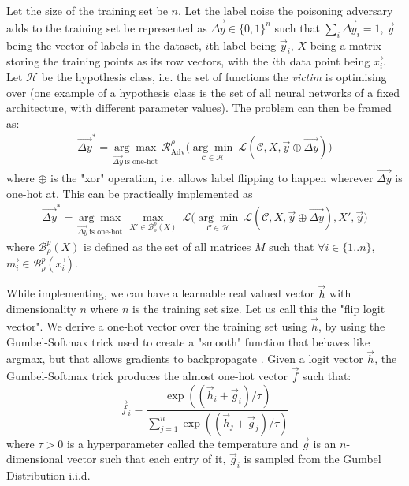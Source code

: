 \documentclass[12pt, oneside]{book}
\begin{document}
Let the size of the training set be $n$. Let the label noise the poisoning
adversary adds to the training set be represented as $\vec{\Delta y} \in \{0,
1\}^{n}$ such that $\sum_i \vec{\Delta y}_i = 1$, $\vec{y}$ being the vector of
labels in the dataset, $i$th label being $\vec{y}_i$, $X$ being a matrix storing
the training points as its row vectors, with the $i$th data point being
$\vec{x_i}$. Let $\mathcal{H}$ be the hypothesis class, i.e. the set of
functions the \emph{victim} is optimising over (one example of a hypothesis
class is the set of all neural networks of a fixed architecture, with different
parameter values). The problem can then be framed as:
\begin{equation}
    \label{eq:optimization}
    \begin{split}
    \vec{\Delta y}^*
    =
    {\underset{\vec{\Delta y}~\text{is one-hot}}
    {\arg\max}}~
    \mathcal{R}_{\text{Adv}}^{\rho}
    \biggl (
        \underset{\mathcal{C} \in \mathcal{H}}{\arg\min}~
        \mathcal{L}(\mathcal{C}, X, \vec{y} \oplus \vec{\Delta y})
    \biggr )
    \end{split}
\end{equation}
where $\oplus$ is the "xor" operation, i.e. allows label flipping to happen
wherever $\vec{\Delta y}$ is one-hot at. This can be practically implemented as
\begin{equation}
    \label{eq:optimization-prac}
    \begin{split}
    \vec{\Delta y}^*
    =
    {\underset{\vec{\Delta y}~\text{is one-hot}}
    {\arg\max}}~
    \underset{X' \in \mathcal{B}_\rho^{p}(X)}{\max}~\mathcal{L} \biggl(
    \underset{\mathcal{C} \in \mathcal{H}}{\arg\min}~
    \mathcal{L}(\mathcal{C}, X, \vec{y} \oplus \vec{\Delta y}),
    X', \vec{y}
    \biggr)
    \end{split}
\end{equation}
where $\mathcal{B}_\rho^{p}(X)$ is defined as the set of all matrices $M$ such
that $\forall i \in \{1..n\}$, $\vec{m_i} \in \mathcal{B}_\rho^{p}(\vec{x_i})$.


While implementing, we can have a learnable real valued vector $\vec{h}$ with
dimensionality $n$ where $n$ is the training set size. Let us call this the
"flip logit vector". We derive a one-hot vector over the training set using
$\vec{h}$, by using the Gumbel-Softmax trick used to create a "smooth" function
that behaves like argmax, but that allows gradients to backpropagate
\citep{DBLP:conf/iclr/MaddisonMT17}. Given a logit vector $\vec{h}$, the
Gumbel-Softmax trick produces the almost one-hot vector $\vec{f}$ such that:
\begin{equation*}
    \vec{f}_i = \frac{\exp((\vec{h}_i + \vec{g}_i)/\tau)}
        {\sum_{j=1}^n \exp((\vec{h}_j + \vec{g}_j)/\tau)}
\end{equation*}
where $\tau > 0$ is a hyperparameter called the temperature and $\vec{g}$ is an
$n$-dimensional vector such that each entry of it, $\vec{g}_i$ is sampled from
the  Gumbel Distribution i.i.d.
\end{document}

